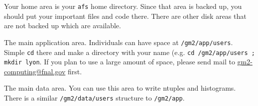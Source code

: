 Your home area is your \texttt{afs} home directory. Since that area is backed up, you should put your important files and code there. There are other disk areas that are not backed up which are available. 

\begin{description}[style=nextline]

\item[\texttt{/gm2/app}]The main application area. Individuals can have space at \texttt{/gm2/app/users}. Simple \texttt{cd} there and make a directory with your name (e.g. \texttt{cd /gm2/app/users ; mkdir lyon}. If you plan to use a large amount of space, please send mail to \url{gm2-computing@fnal.gov} first. \\

\item[\texttt{/gm2/data}]The main data area. You can use this area to write ntuples and histograms. There is a similar \texttt{/gm2/data/users} structure to \texttt{/gm2/app}. 
\end{description}
  
